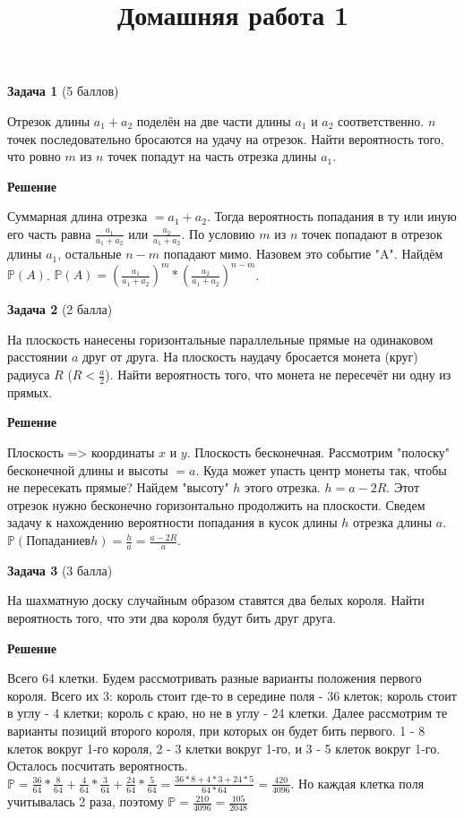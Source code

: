 \documentclass{article}
\title{Домашняя работа 1}
\newcommand\myp{\mathbb P}
\begin{document}
\maketitle
\textbf{Задача 1} (5 баллов)

Отрезок длины $a_1 + a_2$ поделён на две части длины $a_1$ и $a_2$ соответственно. $n$ точек последовательно бросаются на удачу на отрезок. Найти вероятность того, что ровно $m$ из $n$ точек попадут на часть отрезка длины $a_1$.

\textbf{Решение}

Суммарная длина отрезка  $= a_1 + a_2$. Тогда вероятность попадания в ту или иную его часть равна $\frac{a_1}{a_1 + a_2}$ или $\frac{a_2}{a_1 + a_2}$. По условию $m$ из  $n$ точек попадают в отрезок длины $a_1$, остальные $n-m$ попадают мимо. Назовем это событие "A". Найдём $\myp(A)$. $\myp(A) = (\frac{a_1}{a_1 + a_2})^m * (\frac{a_2}{a_1 + a_2})^{n-m}$.
\newline

\textbf{Задача 2} (2 балла)

На плоскость нанесены горизонтальные параллельные прямые на одинаковом расстоянии $a$ друг от друга. На плоскость наудачу бросается монета (круг) радиуса $R$ ($R < \frac{a}{2}$). Найти вероятность того, что монета не пересечёт ни одну из прямых.

\textbf{Решение}

Плоскость => координаты $x$ и $y$. Плоскость бесконечная. Рассмотрим "полоску" бесконечной длины и высоты $= a$. Куда может упасть центр монеты так, чтобы не пересекать прямые? Найдем "высоту" $h$ этого отрезка. $h = a - 2R$. Этот отрезок нужно бесконечно горизонтально продолжить на плоскости. Сведем задачу к нахождению вероятности попадания в кусок длины $h$ отрезка длины $a$. $\myp(Попадание в h) = \frac{h}{a} = \frac{a - 2R}{a}$.
\newline

\textbf{Задача 3} (3 балла)

На шахматную доску случайным образом ставятся два белых короля. Найти вероятность того, что эти два короля будут бить друг друга.

\textbf{Решение}

Всего 64 клетки. Будем рассмотривать разные варианты положения первого короля. Всего их 3: король стоит где-то в середине поля - 36 клеток; король стоит в углу - 4 клетки; король с краю, но не в углу - 24 клетки. Далее рассмотрим те варианты позиций второго короля, при которых он будет бить первого. 1 - 8 клеток вокруг 1-го короля, 2 - 3 клетки вокруг 1-го, и 3 - 5 клеток вокруг 1-го. Осталось посчитать вероятность. $\myp = \frac{36}{64} * \frac{8}{64} + \frac{4}{64} * \frac{3}{64} + \frac{24}{64} * \frac{5}{64} = \frac{36 * 8 + 4 * 3 + 24 * 5}{64 * 64} = \frac{420}{4096}$. Но каждая клетка поля учитывалась 2 раза, поэтому $\myp = \frac{210}{4096} = \frac{105}{2048}$
\newline
\end{document}
